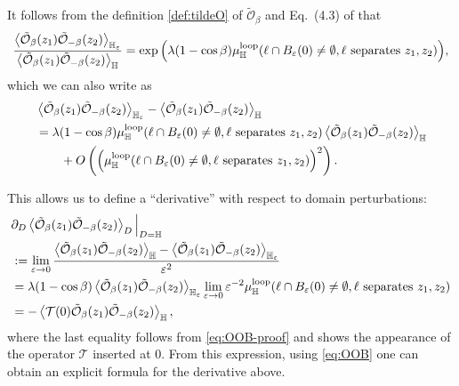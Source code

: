 \documentclass[a4paper,11pt]{article}
\begin{document}
It follows from the definition \eqref{def:tildeO} of $\tilde{\mathcal{O}}_{\beta}$ and Eq.\ (4.3) of \cite{Camia_2016} that
\begin{align}
\begin{split}
    \frac{\Braket{\tilde{\mathcal{O}}_{\beta}(z_1) \tilde{\mathcal{O}}_{-\beta}(z_2)}_{\mathbb{H}_{\varepsilon}}}{\Braket{\tilde{\mathcal{O}}_{\beta}(z_1) \tilde{\mathcal{O}}_{-\beta}(z_2)}_{\mathbb{H}}} = \exp{\left(\lambda(1-\cos\beta) \mu^{\text{loop}}_{\mathbb{H}}(\ell \cap B_{\varepsilon}(0) \neq \emptyset, \ell \text{ separates } z_1,z_2) \right)},
\end{split}
\end{align}
which we can also write as
\begin{align}
\begin{split}
    & \Braket{\tilde{\mathcal{O}}_{\beta}(z_1) \tilde{\mathcal{O}}_{-\beta}(z_2)}_{\mathbb{H}_{\varepsilon}} - \Braket{\tilde{\mathcal{O}}_{\beta}(z_1) \tilde{\mathcal{O}}_{-\beta}(z_2)}_{\mathbb{H}} \\
    &  = \lambda(1-\cos\beta) \mu^{\text{loop}}_{\mathbb{H}}(\ell \cap B_{\varepsilon}(0) \neq \emptyset, \ell \text{ separates } z_1,z_2) \Braket{\tilde{\mathcal{O}}_{\beta}(z_1) \tilde{\mathcal{O}}_{-\beta}(z_2)}_{\mathbb{H}} \\
    & \qquad + O\left( \left(\mu^{\text{loop}}_{\mathbb{H}}(\ell \cap B_{\varepsilon}(0) \neq \emptyset, \ell \text{ separates } z_1,z_2)\right)^2 \right).
\end{split}
\end{align}

This allows us to define a ``derivative'' with respect to domain perturbations:
\begin{align}
\begin{split}
    & \partial_{D} \Braket{\tilde{\mathcal{O}}_{\beta}(z_1) \tilde{\mathcal{O}}_{-\beta}(z_2)}_{D} \Big|_{D=\mathbb{H}} \\
    &:= \lim_{\varepsilon \to 0} \frac{\Braket{\tilde{\mathcal{O}}_{\beta}(z_1) \tilde{\mathcal{O}}_{-\beta}(z_2)}_{\mathbb{H}} - \Braket{\tilde{\mathcal{O}}_{\beta}(z_1) \tilde{\mathcal{O}}_{-\beta}(z_2)}_{\mathbb{H}_{\varepsilon}}}{\varepsilon^2} \\
    &= \lambda(1-\cos\beta) \Braket{\tilde{\mathcal{O}}_{\beta}(z_1) \tilde{\mathcal{O}}_{-\beta}(z_2)}_{\mathbb{H}_{\varepsilon}} \lim_{\varepsilon \to 0} \varepsilon^{-2} \mu^{\text{loop}}_{\mathbb{H}}(\ell \cap B_{\varepsilon}(0) \neq \emptyset, \ell \text{ separates } z_1,z_2) \\
    &= - \Braket{\mathcal{T}(0) \tilde{\mathcal{O}}_{\beta}(z_1) \tilde{\mathcal{O}}_{-\beta}(z_2)}_{\mathbb{H}},
\end{split}
\end{align}
where the last equality follows from \eqref{eq:OOB-proof} and shows the appearance of the operator $\mathcal{T}$ inserted at 0.
From this expression, using \eqref{eq:OOB} one can obtain an explicit formula for the derivative above.
\end{document}
